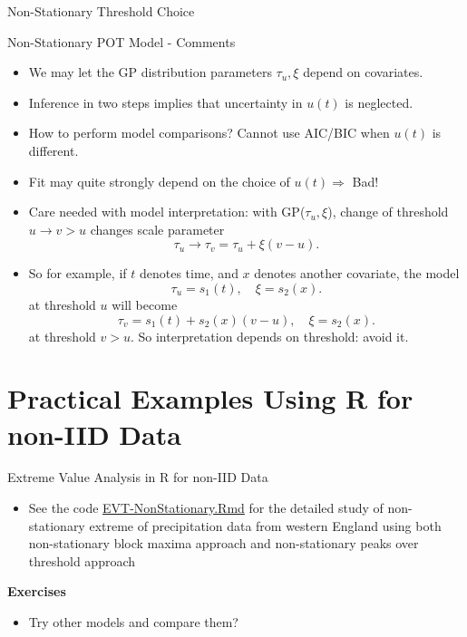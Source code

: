 \documentclass[10pt, hyperref={colorlinks = true,linkcolor = blue}]{beamer}
\begin{document}
{{{\begin{frame}{Non-Stationary Threshold Choice}
\end{frame}


\begin{frame}{Non-Stationary POT Model - Comments}
\begin{itemize}
        \item We may let the GP distribution parameters \(\tau_u, \xi\) depend on covariates.
        \item Inference in two steps implies that uncertainty in  \(u(t)\) is neglected.
        \item How to perform model comparisons? Cannot use AIC/BIC when \(u(t)\) is different.
        \item Fit may quite strongly depend on the choice of \(u(t) \Rightarrow\) Bad!
        \item Care needed with model interpretation: with GP(\(\tau_u, \xi\)), change of threshold \(u \to v > u\) changes scale parameter
        \[
        \tau_u \to \tau_v = \tau_u + \xi(v - u).
        \]
        \item So for example, if \(t\) denotes time, and \(x\) denotes another covariate, the model
        \[
        \tau_u = s_1(t), \quad \xi = s_2(x).
        \]
        at threshold \(u\) will become
        \[
        \tau_v = s_1(t) + s_2(x)(v - u), \quad \xi = s_2(x).
        \]
        at threshold \(v > u\). So interpretation depends on threshold: avoid it.
    \end{itemize}

\end{frame}


}


}


{
\section{Practical Examples Using R for non-IID Data}

\begin{frame}{Extreme Value Analysis in R for non-IID Data}

\begin{itemize}
\item See the code \href{https://github.com/yadavrishikesh/Intro-EVT}{EVT-NonStationary.Rmd} for the detailed study of non-stationary extreme of precipitation data from western England using both non-stationary block maxima approach and non-stationary peaks over threshold approach  
\end{itemize}
\textbf{Exercises}
\begin{itemize}
\item Try other models and compare them?
\end{itemize}
\end{frame}
}


}
\end{document}
